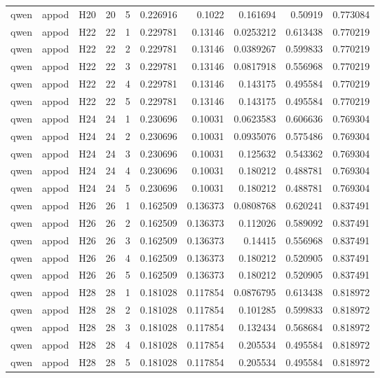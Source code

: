 \begin{longtable}{lllrrrrrrr}
qwen & appod & H20 & 20 & 5 & 0.226916 & 0.1022 & 0.161694 & 0.50919 & 0.773084 \\
qwen & appod & H22 & 22 & 1 & 0.229781 & 0.13146 & 0.0253212 & 0.613438 & 0.770219 \\
qwen & appod & H22 & 22 & 2 & 0.229781 & 0.13146 & 0.0389267 & 0.599833 & 0.770219 \\
qwen & appod & H22 & 22 & 3 & 0.229781 & 0.13146 & 0.0817918 & 0.556968 & 0.770219 \\
qwen & appod & H22 & 22 & 4 & 0.229781 & 0.13146 & 0.143175 & 0.495584 & 0.770219 \\
qwen & appod & H22 & 22 & 5 & 0.229781 & 0.13146 & 0.143175 & 0.495584 & 0.770219 \\
qwen & appod & H24 & 24 & 1 & 0.230696 & 0.10031 & 0.0623583 & 0.606636 & 0.769304 \\
qwen & appod & H24 & 24 & 2 & 0.230696 & 0.10031 & 0.0935076 & 0.575486 & 0.769304 \\
qwen & appod & H24 & 24 & 3 & 0.230696 & 0.10031 & 0.125632 & 0.543362 & 0.769304 \\
qwen & appod & H24 & 24 & 4 & 0.230696 & 0.10031 & 0.180212 & 0.488781 & 0.769304 \\
qwen & appod & H24 & 24 & 5 & 0.230696 & 0.10031 & 0.180212 & 0.488781 & 0.769304 \\
qwen & appod & H26 & 26 & 1 & 0.162509 & 0.136373 & 0.0808768 & 0.620241 & 0.837491 \\
qwen & appod & H26 & 26 & 2 & 0.162509 & 0.136373 & 0.112026 & 0.589092 & 0.837491 \\
qwen & appod & H26 & 26 & 3 & 0.162509 & 0.136373 & 0.14415 & 0.556968 & 0.837491 \\
qwen & appod & H26 & 26 & 4 & 0.162509 & 0.136373 & 0.180212 & 0.520905 & 0.837491 \\
qwen & appod & H26 & 26 & 5 & 0.162509 & 0.136373 & 0.180212 & 0.520905 & 0.837491 \\
qwen & appod & H28 & 28 & 1 & 0.181028 & 0.117854 & 0.0876795 & 0.613438 & 0.818972 \\
qwen & appod & H28 & 28 & 2 & 0.181028 & 0.117854 & 0.101285 & 0.599833 & 0.818972 \\
qwen & appod & H28 & 28 & 3 & 0.181028 & 0.117854 & 0.132434 & 0.568684 & 0.818972 \\
qwen & appod & H28 & 28 & 4 & 0.181028 & 0.117854 & 0.205534 & 0.495584 & 0.818972 \\
qwen & appod & H28 & 28 & 5 & 0.181028 & 0.117854 & 0.205534 & 0.495584 & 0.818972 \\

\end{longtable}
